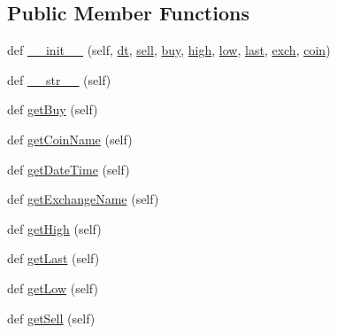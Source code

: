 \subsection*{Public Member Functions}
\begin{DoxyCompactItemize}
\item 
def \hyperlink{classexch2exch_1_1_xbt_prices_a1ac4bfa8ff644bc22a369397a5e01caa}{\+\_\+\+\_\+init\+\_\+\+\_\+} (self, \hyperlink{classexch2exch_1_1_xbt_prices_af9f916c683c48631c97f1c5d91447751}{dt}, \hyperlink{classexch2exch_1_1_xbt_prices_a06fd0cfb03d485af3364a0d86fbe5385}{sell}, \hyperlink{classexch2exch_1_1_xbt_prices_a8f1d8ac0ef114ea3645314578697b7ac}{buy}, \hyperlink{classexch2exch_1_1_xbt_prices_aeae6235417d65d9e9c768a51c38d5388}{high}, \hyperlink{classexch2exch_1_1_xbt_prices_a8cef13f833a894d4fc5b8296bb4906fa}{low}, \hyperlink{classexch2exch_1_1_xbt_prices_a1da8993986574b27edcaf7259e78c899}{last}, \hyperlink{classexch2exch_1_1_xbt_prices_a72caf3a29017a1ceaf4367240a46b360}{exch}, \hyperlink{classexch2exch_1_1_xbt_prices_a1191c8825e8f1333b4100b89fa2be053}{coin})
\item 
def \hyperlink{classexch2exch_1_1_xbt_prices_a1cf49c525e93b6615debba631e5801d7}{\+\_\+\+\_\+str\+\_\+\+\_\+} (self)
\item 
def \hyperlink{classexch2exch_1_1_xbt_prices_aa7cda2f119828f77250dcafc3a0e1dfc}{get\+Buy} (self)
\item 
def \hyperlink{classexch2exch_1_1_xbt_prices_acc3d7366d6093186bc7afe3d9364d7a9}{get\+Coin\+Name} (self)
\item 
def \hyperlink{classexch2exch_1_1_xbt_prices_af683e90a9db529a99eef04c5141770ea}{get\+Date\+Time} (self)
\item 
def \hyperlink{classexch2exch_1_1_xbt_prices_ac6e393f1a446218dcb31d00dd8858912}{get\+Exchange\+Name} (self)
\item 
def \hyperlink{classexch2exch_1_1_xbt_prices_a3cf0b53b06d0e83a15bb682b7b47a073}{get\+High} (self)
\item 
def \hyperlink{classexch2exch_1_1_xbt_prices_a2b28c55545cb3bc56cd64e05f0e5b30b}{get\+Last} (self)
\item 
def \hyperlink{classexch2exch_1_1_xbt_prices_ae9b94f4f95f7ba5369416fde77308e7e}{get\+Low} (self)
\item 
def \hyperlink{classexch2exch_1_1_xbt_prices_af9dde8f1bc61fbff30bc4cfa4d8d1f50}{get\+Sell} (self)
\end{DoxyCompactItemize}
